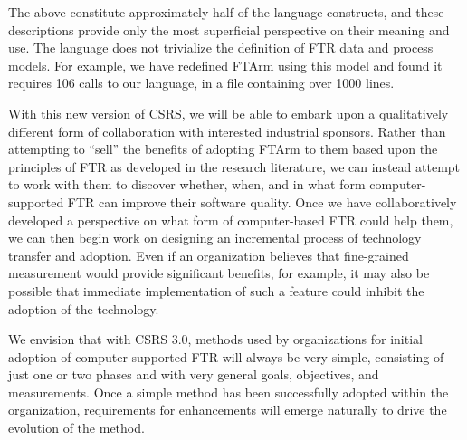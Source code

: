 The above constitute approximately half of the language constructs, and
these descriptions provide only the most superficial perspective on their
meaning and use.  The language does not trivialize the definition of FTR
data and process models.  For example, we have redefined FTArm using this
model and found it requires 106 calls to our language, in a file containing
over 1000 lines.

With this new version of CSRS, we will be able to embark upon a
qualitatively different form of collaboration with interested industrial
sponsors.  Rather than attempting to ``sell'' the benefits of adopting
FTArm to them based upon the principles of FTR as developed in the research
literature, we can instead attempt to work with them to discover whether,
when, and in what form computer-supported FTR can improve their software
quality.  Once we have collaboratively developed a perspective on what form
of computer-based FTR could help them, we can then begin work on designing
an incremental process of technology transfer and adoption.  Even if an
organization believes that fine-grained measurement would provide
significant benefits, for example, it may also be possible that immediate
implementation of such a feature could inhibit the adoption of the
technology.  

We envision that with CSRS 3.0, methods used by organizations for initial
adoption of computer-supported FTR will always be very simple, consisting
of just one or two phases and with very general goals, objectives, and
measurements.  Once a simple method has been successfully adopted within
the organization, requirements for enhancements will emerge naturally to
drive the evolution of the method.

















